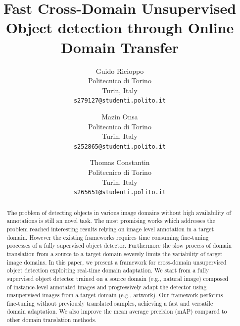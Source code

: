 \documentclass[10pt,twocolumn,letterpaper]{article}
\begin{document}
\title{Fast Cross-Domain Unsupervised Object detection through Online Domain Transfer}


\author{Guido Ricioppo\\
Politecnico di Torino\\
Turin, Italy\\
{\tt\small s279127@studenti.polito.it}
\and
Mazin Onsa\\
Politecnico di Torino\\
Turin, Italy\\
{\tt\small s252865@studenti.polito.it}
\and
Thomas Constantin \\
Politecnico di Torino \\
Turin, Italy \\
{\tt\small s265651@studenti.polito.it}}

\maketitle

\begin{abstract}
    The problem of detecting objects in various image domains without high availability of annotations is still an novel task. The most promising works which addresses the problem reached interesting results relying on image level annotation in a target domain. However the existing frameworks requires time consuming fine-tuning processes of a fully supervised object detector. Furthermore the slow process of domain translation from a source to a target domain severely limits the variability of target image domains. In this paper, we present a framework for cross-domain unsupervised object detection exploiting real-time domain adaptation. We start from a fully supervised object detector trained on a source domain (e.g., natural image) composed of instance-level annotated images and progressively adapt the detector using unsupervised images from a target domain (e.g., artwork). Our framework performs fine-tuning without previously translated samples, achieving a fast and versatile domain adaptation. We also improve the mean average precision (mAP) compared to other domain translation methods.
\end{abstract}
\end{document}
